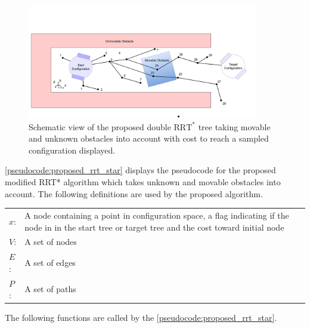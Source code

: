 \begin{figure}[H]
    \centering
    \includegraphics[width=0.9\textwidth]{figures/rrt_with_costs.png}
    \caption{Schematic view of the proposed double $\text{RRT}^*$ tree taking movable and unknown obstacles into account with cost to reach a sampled configuration displayed.}
    \label{fig:double_rrt_alg}
\end{figure}


\cref{pseudocode:proposed_rrt_star} displays the pseudocode for the proposed modified \ac{RRT*} algorithm which takes unknown and movable obstacles into account. The following definitions are used by the proposed algorithm.\bs


\begin{center}
\begin{tabular}[t]{l p{10cm}}
$x$:& A node containing a point in configuration space, a flag indicating if the node in in the start tree or target tree and the cost toward initial node\\
$V$:& A set of nodes\\
$E$:& A set of edges\\
$P$:& A set of paths\\
\end{tabular}
\end{center}


The following functions are called by the \cref{pseudocode:proposed_rrt_star}.\\ 

